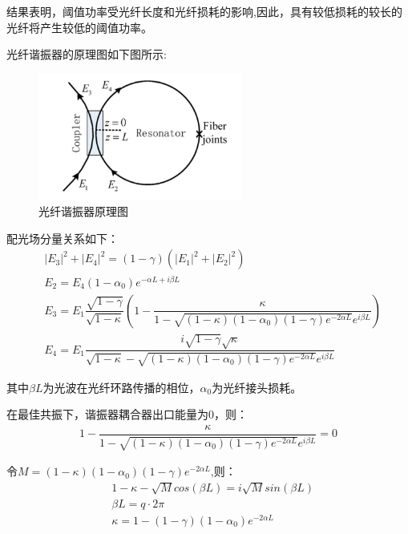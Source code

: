 \documentclass[UTF8]{ctexart}
\begin{document}
结果表明，阈值功率受光纤长度和光纤损耗的影响,因此，具有较低损耗的较长的光纤将产生较低的阈值功率。


光纤谐振器的原理图如下图\cite{Nelson2019ReducingNI}所示:
\begin{figure}[H]
	\begin{center}
		\includegraphics[width=0.6\textwidth]{3.png}
		\caption{光纤谐振器原理图}
	\end{center}
\end{figure}


配光场分量关系如下：
\begin{equation}
	\begin{aligned}
		&|E_{3}|^{2}+|E_{4}|^{2}=(1-\gamma)(|E_{1}|^{2}+|E_{2}|^{2})\\
		&E_{2}=E_{4}(1-\alpha_{0})e^{-\alpha L+i\beta L}\\
		&E_{3}=E_{1}\dfrac{\sqrt{1-\gamma}}{\sqrt{1-\kappa}}(1-\dfrac{\kappa}{1-\sqrt{(1-\kappa)(1-\alpha_{0})(1-\gamma)e^{-2\alpha L}}e^{i\beta L}})\\
		&E_{4}=E_{1}\dfrac{i\sqrt{1-\gamma}\sqrt{\kappa}}{\sqrt{1-\kappa}-\sqrt{(1-\kappa)(1-\alpha_{0})(1-\gamma)e^{-2\alpha L}}e^{i\beta L}}
	\end{aligned}
\end{equation}


其中$\beta L$为光波在光纤环路传播的相位，$\alpha_{0}$为光纤接头损耗。


在最佳共振下，谐振器耦合器出口能量为0，则：\begin{equation}
	\begin{aligned}
		1-\dfrac{\kappa}{1-\sqrt{(1-\kappa)(1-\alpha_{0})(1-\gamma)e^{-2\alpha L}}e^{i\beta L}}=0
	\end{aligned}
\end{equation}


令$M=(1-\kappa)(1-\alpha_{0})(1-\gamma)e^{-2\alpha L}$,则：
\begin{equation}
	\begin{aligned}
		&1-\kappa-\sqrt{M}cos(\beta L)=i\sqrt{M}sin(\beta L)\\
		&\beta L=q\cdot 2\pi\\
		&\kappa=1-(1-\gamma)(1-\alpha_{0})e^{-2\alpha L}
	\end{aligned}
\end{equation}
\end{document}
